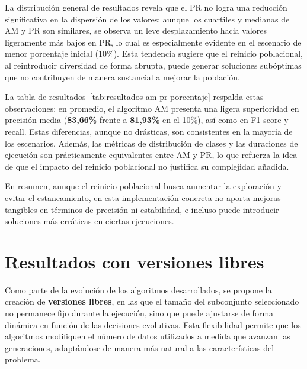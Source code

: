 La distribución general de resultados revela que el PR no logra una reducción significativa en la dispersión de los valores:
aunque los cuartiles y medianas de AM y PR son similares, se observa un leve desplazamiento hacia valores ligeramente más bajos en PR,
lo cual es especialmente evidente en el escenario de menor porcentaje inicial (10\%).
Esta tendencia sugiere que el reinicio poblacional, al reintroducir diversidad de forma abrupta,
puede generar soluciones subóptimas que no contribuyen de manera sustancial a mejorar la población.

La tabla de resultados~\ref{tab:resultados-am-pr-porcentaje} respalda estas observaciones: en promedio,
el algoritmo AM presenta una ligera superioridad en precisión media (\textbf{83,66\%} frente a \textbf{81,93\%} en el 10\%), así como en F1-score y recall.
Estas diferencias, aunque no drásticas, son consistentes en la mayoría de los escenarios.
Además, las métricas de distribución de clases y las duraciones de ejecución son prácticamente equivalentes entre AM y PR,
lo que refuerza la idea de que el impacto del reinicio poblacional no justifica su complejidad añadida.

En resumen, aunque el reinicio poblacional busca aumentar la exploración y evitar el estancamiento,
en esta implementación concreta no aporta mejoras tangibles en términos de precisión ni estabilidad,
e incluso puede introducir soluciones más erráticas en ciertas ejecuciones.

\section{Resultados con versiones libres}\label{sec:resultados-versiones-libres}
Como parte de la evolución de los algoritmos desarrollados, se propone la creación de \textbf{versiones libres},
en las que el tamaño del subconjunto seleccionado no permanece fijo durante la ejecución, sino que puede ajustarse de forma dinámica en función de las decisiones evolutivas.
Esta flexibilidad permite que los algoritmos modifiquen el número de datos utilizados a medida que avanzan las generaciones,
adaptándose de manera más natural a las características del problema.

